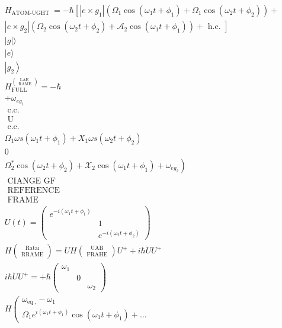 \documentclass[10pt]{article}
\begin{document}
$$
\begin{aligned}
& H_{\text {ATOM-UGHT }}=-\hbar\left[\left|e \times g_{1}\right|\left(\Omega_{1} \cos \left(\omega_{1} t+\phi_{1}\right)+\Omega_{1} \cos \left(\omega_{2} t+\phi_{2}\right)\right)+\right. \\
& \left.\left|e \times g_{2}\right|\left(\Omega_{2} \cos \left(\omega_{2} t+\phi_{2}\right)+\mathscr{A}_{2} \cos \left(\omega_{1} t+\phi_{1}\right)\right)+\text { h.c. }\right] \\
& |g|\rangle \\
& |e\rangle \\
& \left|g_{2}\right\rangle \\
& H_{\text {FULL }}^{\binom{\text {LAE }}{\text { RAME }}}=-\hbar \\
& +\omega_{e g_{1}} \\
& \text { c.c. } \\
& \text { U } \\
& \text { c.c. } \\
& \Omega_{1} \omega s\left(\omega_{1} t+\phi_{1}\right)+X_{1} \omega s\left(\omega_{2} t+\phi_{2}\right) \\
& 0 \\
& \left.\Omega_{2}^{*} \cos \left(\omega_{2} t+\phi_{2}\right)+\mathscr{X}_{2} \cos \left(\omega_{1} t+\phi_{1}\right)+\omega_{e g_{2}}\right) \\
& \text { CIANGE GF } \\
& \text { REFERENCE } \\
& \text { FRAME } \\
& U(t)=\left(\begin{array}{cc}
e^{-i\left(\omega_{1} t+\phi_{1}\right)} & \\
& 1 \\
& e^{-i\left(\omega_{2} t+\phi_{2}\right)}
\end{array}\right) \\
& H\binom{\text { Ratai }}{\text { RRAME }}=U H\binom{\text { UAB }}{\text { FRAHE }} U^{+}+i \hbar \dot{U} U^{+} \\
& i \hbar \dot{U} U^{+}=+\hbar\left(\begin{array}{ccc}
\omega_{1} & & \\
& 0 & \\
& & \omega_{2}
\end{array}\right) \\
& H\left(\begin{array}{c}
\omega_{\text {eq },}-\omega_{1} \\
\Omega_{1} e^{i\left(\omega_{1} t+\phi_{1}\right)} \cos \left(\omega_{1} t+\phi_{1}\right)+\ldots

\end{array}
\end{aligned}$$
\end{document}
